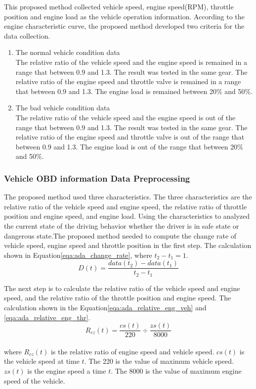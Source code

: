 This proposed method collected vehicle speed, engine speed(RPM), throttle position and engine load as the vehicle operation information. According to the engine characteristic curve, the proposed method developed two criteria for the data collection.

\begin{enumerate}
\item The normal vehicle condition data \\
The relative ratio of the vehicle speed and the engine speed is remained in a range that between 0.9 and 1.3. The result was tested in the same gear. The relative ratio of the engine speed and throttle valve is remained in a range that between 0.9 and 1.3. The engine load is remained between 20\% and 50\%.  
\item The bad vehicle condition data \\
The relative ratio of the vehicle speed and the engine speed is out of the range that between 0.9 and 1.3. The result was tested in the same gear. The relative ratio of the engine speed and throttle valve is out of the range that between 0.9 and 1.3. The engine load is out of the range that between 20\% and 50\%.
\end{enumerate}

\subsubsection{Vehicle OBD information Data Preprocessing}
The proposed method used three characteristics. The three characteristics are the relative ratio of the vehicle speed and engine speed, the relative ratio of throttle position and engine speed, and engine load. Using the characteristics to analyzed the current state of the driving behavior whether the driver is in safe state or dangerous state.The proposed method needed to compute the change rate of vehicle speed, engine speed and throttle position in the first step. The calculation shown in Equation\eqref{eqa:ada_change_rate}, where $t_{2} - t_{1} = 1$.\\
\begin{equation}
\label{eqa:ada_change_rate}
D(t) = \dfrac{data(t_{2})-data(t_{1})}{t_{2}-t_{1}}
\end{equation}

The next step is to calculate the relative ratio of the vehicle speed and engine speed, and the relative ratio of the throttle position and engine speed. The calculation shown in the Equation\eqref{eqa:ada_relative_eng_veh} and \eqref{eqa:ada_relative_eng_thr}. \\
\begin{equation}
\label{eqa:ada_relative_eng_veh}
R_{cz}(t) = \dfrac{cs(t)}{220} \div \dfrac{zs(t)}{8000}
\end{equation}
\\
where $R_{cz}(t)$ is the relative ratio of engine speed and vehicle speed. $cs(t)$ is the vehicle speed at time $t$. The 220 is the value of maximum vehicle speed. $zs(t)$ is the engine speed a time $t$. The 8000 is the value of maximum engine speed of the vehicle.\\

